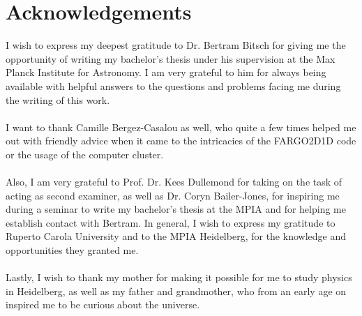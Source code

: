 
\section*{Acknowledgements}
  I wish to express my deepest gratitude to Dr. Bertram Bitsch for giving me 
  the opportunity of writing my bachelor's thesis under his supervision at the 
  Max Planck Institute for Astronomy. I am very grateful to him for always 
  being available with helpful answers to the questions and problems facing me 
  during the writing of this work. \\
  \\
  I want to thank Camille Bergez-Casalou as well, who quite a few times helped 
  me out with friendly advice when it came to the intricacies of the FARGO2D1D 
  code or the usage of the computer cluster. \\
  \\
  Also, I am very grateful to Prof. Dr. Kees Dullemond for taking on the task 
  of acting as second examiner, as well as Dr. Coryn Bailer-Jones, for 
  inspiring me during a seminar to write my bachelor's thesis at the MPIA and 
  for helping me establish contact with Bertram. In general, I wish to express 
  my gratitude to Ruperto Carola University and to the MPIA Heidelberg, for the 
  knowledge and opportunities they granted me. \\
  \\
%
%
%
%
%
%
  Lastly, I wish to thank my mother for making it possible for me to study 
  physics in Heidelberg, as well as my father and grandmother, who from an 
  early age on inspired me 
  to be curious about the universe.
%
%
%
